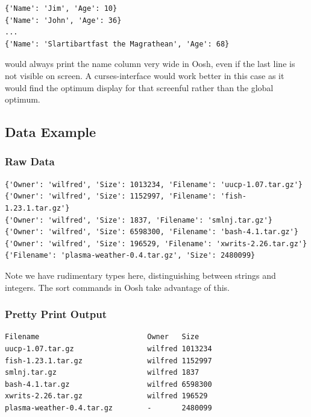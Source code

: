 \documentclass[12pt,twoside,notitlepage]{report}
\begin{document}
\begin{verbatim}
{'Name': 'Jim', 'Age': 10}
{'Name': 'John', 'Age': 36}
...
{'Name': 'Slartibartfast the Magrathean', 'Age': 68}
\end{verbatim}

would always print the name column very wide in Oosh, even if the last
line is not visible on screen. A curses-interface would work better in
this case as it would find the optimum display for that screenful
rather than the global optimum.



\subsection{Data Example}
\subsubsection{Raw Data}
\label{rawdata}
\begin{verbatim}
{'Owner': 'wilfred', 'Size': 1013234, 'Filename': 'uucp-1.07.tar.gz'}
{'Owner': 'wilfred', 'Size': 1152997, 'Filename': 'fish-1.23.1.tar.gz'}
{'Owner': 'wilfred', 'Size': 1837, 'Filename': 'smlnj.tar.gz'}
{'Owner': 'wilfred', 'Size': 6598300, 'Filename': 'bash-4.1.tar.gz'}
{'Owner': 'wilfred', 'Size': 196529, 'Filename': 'xwrits-2.26.tar.gz'}
{'Filename': 'plasma-weather-0.4.tar.gz', 'Size': 2480099}
\end{verbatim}
Note we have rudimentary types here, distinguishing between strings and
integers. The sort commands in Oosh take advantage of this.

\subsubsection{Pretty Print Output}
\begin{verbatim}
Filename                         Owner   Size      
uucp-1.07.tar.gz                 wilfred 1013234   
fish-1.23.1.tar.gz               wilfred 1152997   
smlnj.tar.gz                     wilfred 1837      
bash-4.1.tar.gz                  wilfred 6598300   
xwrits-2.26.tar.gz               wilfred 196529    
plasma-weather-0.4.tar.gz        -       2480099
\end{verbatim}
\end{document}
